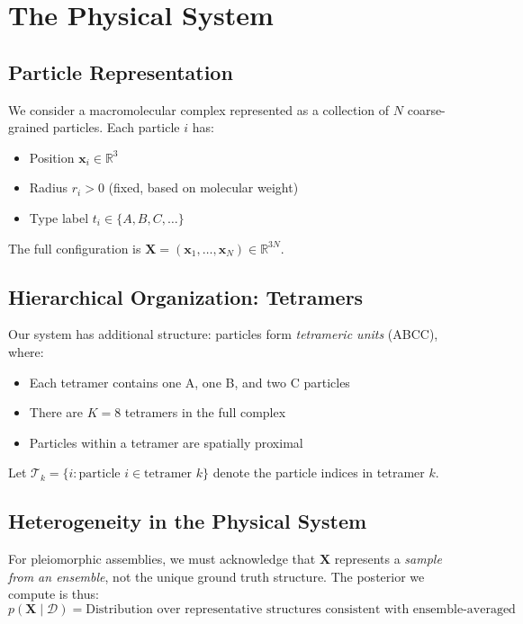 \documentclass[11pt,a4paper]{article}
\newcommand{\bx}{\mathbf{x}}
\newcommand{\bX}{\mathbf{X}}
\newcommand{\R}{\mathbb{R}}
\theoremstyle{definition}
\begin{document}
\section{The Physical System}

\subsection{Particle Representation}

We consider a macromolecular complex represented as a collection of $N$ coarse-grained particles. Each particle $i$ has:
\begin{itemize}
    \item Position $\bx_i \in \R^3$
    \item Radius $r_i > 0$ (fixed, based on molecular weight)
    \item Type label $t_i \in \{A, B, C, \ldots\}$
\end{itemize}

The full configuration is $\bX = (\bx_1, \ldots, \bx_N) \in \R^{3N}$.

\subsection{Hierarchical Organization: Tetramers}

Our system has additional structure: particles form \textit{tetrameric units} (ABCC), where:
\begin{itemize}
    \item Each tetramer contains one A, one B, and two C particles
    \item There are $K = 8$ tetramers in the full complex
    \item Particles within a tetramer are spatially proximal
\end{itemize}

Let $\mathcal{T}_k = \{i : \text{particle } i \in \text{tetramer } k\}$ denote the particle indices in tetramer $k$.

\subsection{Heterogeneity in the Physical System}

For pleiomorphic assemblies, we must acknowledge that $\bX$ represents a \textit{sample from an ensemble}, not the unique ground truth structure. The posterior we compute is thus:
\begin{equation}
    p(\bX \mid \mathcal{D}) = \text{Distribution over representative structures consistent with ensemble-averaged data}
\end{equation}
\end{document}
